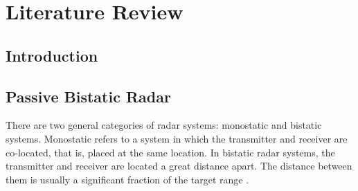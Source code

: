 %
%
%
%
%
%
\chapter{Literature Review}
\label{ch:review}

\section{Introduction}
\label{sec:ch2.introduction}
\todo{}

\section{Passive Bistatic Radar}
\label{sec:ch2.pbr}
There are two general categories of radar systems: monostatic and bistatic systems. Monostatic refers to a system in which the transmitter and receiver are co-located, that is, placed at the same location. In bistatic radar systems, the transmitter and receiver are located a great distance apart. The distance between them is usually a significant fraction of the target range \citep{griffiths2007}.

